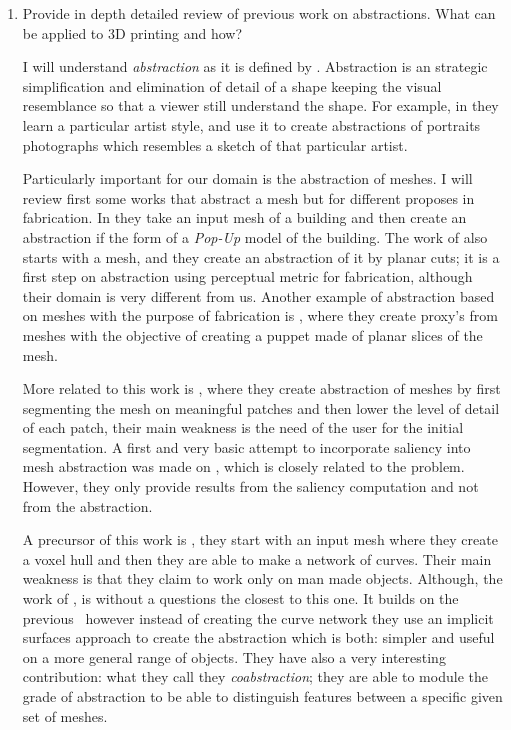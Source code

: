 \begin{enumerate}
  
	\item Provide in depth detailed review of previous work on abstractions. What can be applied to 3D printing and how?
	
		I will understand \emph{abstraction} as it is defined by \cite{Mi2009}. Abstraction is an strategic simplification and elimination of detail of a shape  keeping the visual resemblance so that a viewer still understand the shape. For example, in \cite{Berger2013} they learn a particular artist style, and use it to create abstractions of portraits photographs which resembles a sketch of that particular artist. 
		
		Particularly important for our domain is the abstraction of meshes. I will review first some works that abstract a mesh but for different proposes in fabrication. In \cite{Li2010} they take an input mesh of a building and then create an abstraction if the form of a \emph{Pop-Up} model of the building. The work of \cite{Hildebrand2012} also starts with a mesh, and they create an abstraction of it by planar cuts; it is a first step on abstraction using perceptual metric for fabrication, although their domain is very different from us. Another example of abstraction based on meshes with the purpose of fabrication is \cite{McCrae2011}, where they create proxy’s from meshes with the objective of creating a puppet made of planar slices of the mesh.
		
		More related to this work is \cite{DeGoes2011}, where they create abstraction of meshes by first segmenting the mesh on meaningful patches and then lower the level of detail of each patch, their main weakness is the need of the user for the initial segmentation. A first and very basic attempt to incorporate saliency into mesh abstraction was made on \cite{Yang2009}, which is closely related to the problem. However, they only provide results from the saliency computation and not from the abstraction. 
		
		A precursor of this work is \cite{Mehra2009}, they start with an input mesh where they create a voxel hull and then they are able to make a network of curves. Their main weakness is that they claim to work only on man made objects. Although, the work of \cite{Yumer2012}, is without a questions the closest to this one. It builds on the previous~\cite{Mehra2009} however instead of creating the curve network they use an implicit surfaces approach to create the abstraction which is both: simpler and useful on a more general range of objects. They have also a very interesting contribution: what they call they \emph{coabstraction}; they are able to module the grade of abstraction to be able to distinguish features between a specific given set of meshes.
	

\end{enumerate}
